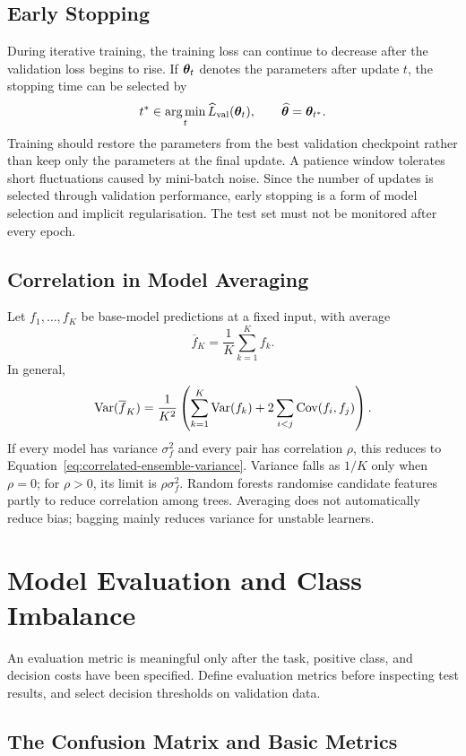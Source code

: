 \subsection{Early Stopping}

During iterative training, the training loss can continue to decrease after the validation loss begins to rise. If $\bm{\theta}_t$ denotes the parameters after update $t$, the stopping time can be selected by
\[
  t^*\in\operatorname*{arg\,min}_t
    \widehat L_{\mathrm{val}}(\bm{\theta}_t),
  \qquad
  \widehat{\bm{\theta}}=\bm{\theta}_{t^*}.
\]
Training should restore the parameters from the best validation checkpoint rather than keep only the parameters at the final update. A patience window tolerates short fluctuations caused by mini-batch noise. Since the number of updates is selected through validation performance, early stopping is a form of model selection and implicit regularisation. The test set must not be monitored after every epoch.

\subsection{Correlation in Model Averaging}

Let $f_1,\ldots,f_K$ be base-model predictions at a fixed input, with average
\[
  \overline f_K=\frac1K\sum_{k=1}^{K}f_k.
\]
In general,
\[
  \operatorname{Var}(\overline f_K)
  =\frac{1}{K^2}
    \left(
      \sum_{k=1}^{K}\operatorname{Var}(f_k)
      +2\sum_{i<j}\operatorname{Cov}(f_i,f_j)
    \right).
\]
If every model has variance $\sigma_f^2$ and every pair has correlation $\rho$,
this reduces to Equation~\eqref{eq:correlated-ensemble-variance}. Variance falls
as $1/K$ only when $\rho=0$; for $\rho>0$, its limit is $\rho\sigma_f^2$.
Random forests randomise candidate features partly to reduce correlation among
trees. Averaging does not automatically reduce bias; bagging mainly reduces
variance for unstable learners.

\section{Model Evaluation and Class Imbalance}

An evaluation metric is meaningful only after the task, positive class, and decision costs have been specified. Define evaluation metrics before inspecting test results, and select decision thresholds on validation data.

\subsection{The Confusion Matrix and Basic Metrics}

